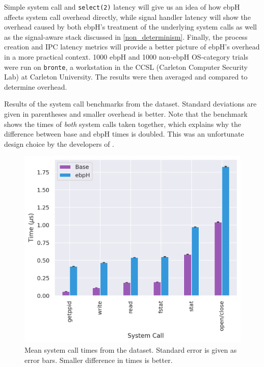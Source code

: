 \documentclass[
  12pt]{findlay}
\newcommand{\passthrough}[1]{#1}
\begin{document}
Simple system call and \passthrough{\lstinline!select(2)!} latency will
give us an idea of how ebpH affects system call overhead directly, while
signal handler latency will show the overhead caused by both ebpH's
treatment of the underlying system calls as well as the signal-aware
stack discussed in \autoref{non_determinism}. Finally, the process
creation and IPC latency metrics will provide a better picture of ebpH's
overhead in a more practical context. 1000 ebpH and 1000 non-ebpH
OS-category trials were run on \passthrough{\lstinline!bronte!}, a
workstation in the CCSL (Carleton Computer Security Lab) at Carleton
University. The results were then averaged and compared to determine
overhead.

\begin{table}
    \caption[Results of the system call benchmarks from the  dataset]{
        Results of the system call benchmarks from the  dataset.
        Standard deviations are given in parentheses and smaller overhead is better. Note that the 
        benchmark shows the times of \emph{both} system calls taken together, which explains why the difference
        between base and ebpH times is doubled. This was an unfortunate design choice by the developers of .
    }
    \label{bronte_lmbench_syscall}
    
\end{table}

\begin{figure}
    \caption[Mean system call times from the  dataset]{
        Mean system call times from the  dataset.
        Standard error is given as error bars.
        Smaller difference in times is better.
    }
    \label{bronte_lmbench_syscall_graph}
    \includegraphics[width=.6\textwidth]{../data/bench/bronte-lmbench/syscall_times.png}
\end{figure}
\end{document}
